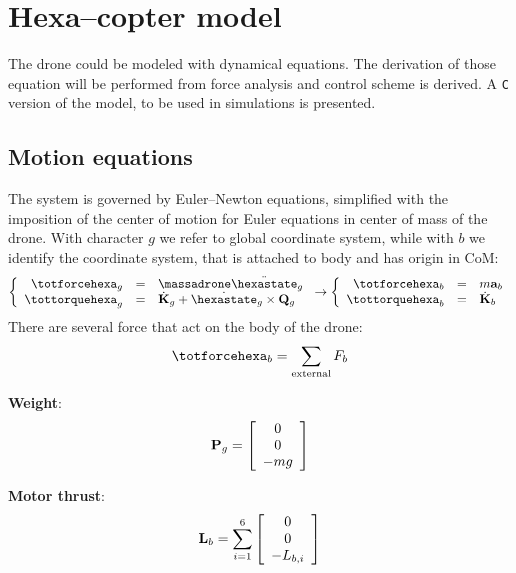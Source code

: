 \section{Hexa--copter model}

The drone could be modeled with dynamical equations. The derivation of those equation will be performed from force analysis and control scheme is derived. A \texttt{C} version of the model, to be used in simulations is presented.

\subsection{Motion equations}
The system is governed by Euler--Newton equations, simplified with the imposition of the center of motion for Euler equations in center of mass of the drone. With character $g$ we refer to global coordinate system, while with $b$ we identify the coordinate system, that is attached to body and has origin in CoM:
\begin{equation}
\left\{
\begin{array}{rcl}
\totforcehexa_g & = & \massadrone \ddot{\hexastate}_g \\
\tottorquehexa_g & = & \dot{\mathbf{K}}_g + \dot{\hexastate}_g \times \mathbf{Q}_g%
\end{array}
\right.  \rightarrow  \left\{
\begin{array}{rcl}
\totforcehexa_b & = & m \mathbf{a}_b \\
\tottorquehexa_b & = & \dot{\mathbf{K}}_b%
\end{array}
\right.
\end{equation}
There are several force that act on the body of the drone:
\begin{equation}
\totforcehexa_b = \sum\limits_{\mathrm{external}} F_b
\end{equation}

\textbf{Weight}:
\begin{equation}
\mathbf{P}_g = \left[\begin{array}{c}0 \\ 0 \\ - m g\end{array}\right]
\end{equation}

\textbf{Motor thrust}:
\begin{equation}
\mathbf{L}_b = \sum\limits_{i=1}^6 \left[\begin{array}{c}0 \\ 0 \\ -L_{b,i}\end{array}\right]
\end{equation}

